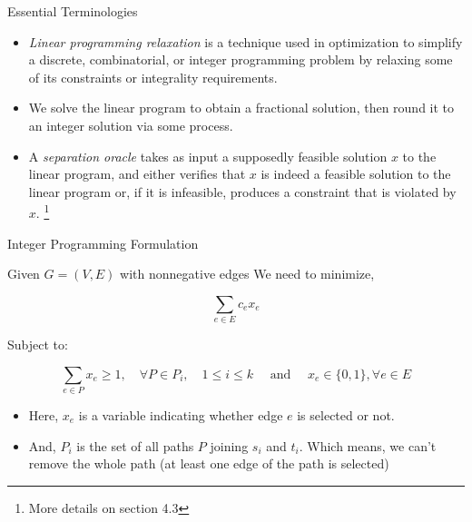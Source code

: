 \documentclass{beamer}
\begin{document}
\begin{frame}{Essential Terminologies}
\begin{itemize}
    \item \textit{Linear programming relaxation} is a technique used in optimization to simplify a discrete, combinatorial, or integer programming problem by relaxing some of its constraints or integrality requirements. \newline

    \item We solve the linear program to obtain a fractional solution, then round it to an integer solution via some process. \newline

    \pause

    \item A \textit{separation oracle} takes as input a supposedly feasible solution $x$ to the linear program, and either verifies that $x$ is indeed a feasible solution to the linear program or, if it is infeasible, produces a constraint that is violated by $x$. \footnote{More details on section 4.3} 

\end{itemize}  
\end{frame}

 



\begin{frame}{Integer Programming Formulation}

Given \(G = (V, E)\) with nonnegative edges  We need to minimize, 

\[
\sum_{e \in E} c_e x_e
\]

Subject to:

\[
\sum_{e \in P} x_e \geq 1, \quad \forall P \in P_i, \quad 1 \leq i \leq k \quad \text{ and } \quad x_e \in \{0, 1\},  \forall e \in E
\] \newline

\begin{itemize}
    \item Here, \(x_e\) is a variable indicating whether edge \(e\) is selected or not.

    \item And, $P_i$ is the set of all paths $P$ joining $s_i$ and $t_i$. Which means, we can't remove the whole path (at least one edge of the path is selected) 

    \end{itemize}
\end{frame}
\end{document}
